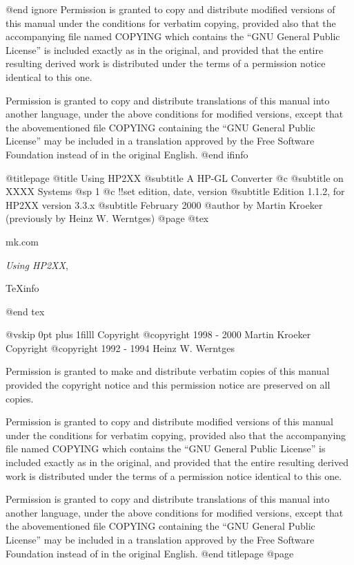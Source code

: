 @end ignore
Permission is granted to copy and distribute modified versions of this
manual under the conditions for verbatim copying, provided also that the
accompanying file named COPYING which contains the ``GNU General Public
License'' is included exactly as in the original, and provided that the
entire resulting derived work is distributed under the terms of a permission
notice identical to this one.

Permission is granted to copy and distribute translations of this manual
into another language, under the above conditions for modified versions,
except that the abovementioned file COPYING containing the
``GNU General Public License'' may be included in a translation approved
by the Free Software Foundation instead of in the original English.
@end ifinfo

@titlepage
@title Using HP2XX
@subtitle A HP-GL Converter
@c @subtitle on XXXX Systems
@sp 1
@c !!set edition, date, version
@subtitle Edition 1.1.2, for HP2XX version 3.3.x
@subtitle February 2000
@author by Martin Kroeker (previously by Heinz W. Werntges)
@page
@tex
{\parskip=0pt
\hfill mk\@daveg.com\par
\hfill {\it Using HP2XX}, \manvers\par
\hfill \TeX{}info \texinfoversion\par
}
@end tex

@vskip 0pt plus 1filll
Copyright @copyright{} 1998 - 2000 Martin Kroeker
Copyright @copyright{} 1992 - 1994 Heinz W. Werntges

Permission is granted to make and distribute verbatim copies of
this manual provided the copyright notice and this permission notice
are preserved on all copies.

Permission is granted to copy and distribute modified versions of this
manual under the conditions for verbatim copying, provided also that the
accompanying file named COPYING which contains the ``GNU General Public
License'' is included exactly as in the original, and provided that the
entire resulting derived work is distributed under the terms of a permission
notice identical to this one.

Permission is granted to copy and distribute translations of this manual
into another language, under the above conditions for modified versions,
except that the abovementioned file COPYING containing the
``GNU General Public License'' may be included in a translation approved
by the Free Software Foundation instead of in the original English.
@end titlepage
@page

